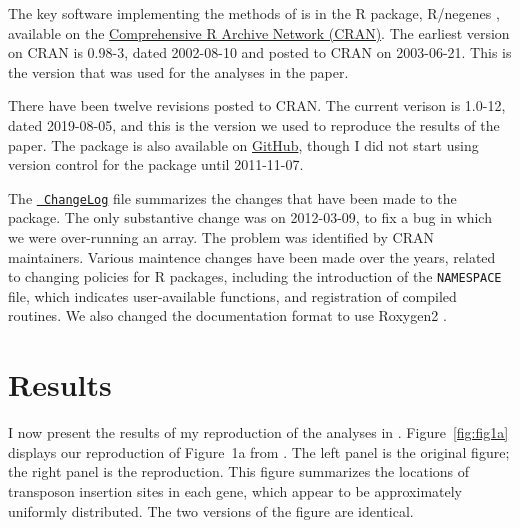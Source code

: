 The key software implementing the methods of \citet{lamichhane2003}
is in the R package, R/negenes \citep{negenes}, available on the
\href{https://cran.r-project.org/package=negenes}{Comprehensive R
Archive Network (CRAN)}. The earliest version on CRAN is 0.98-3, dated
2002-08-10 and posted to CRAN on 2003-06-21. This is the version that
was used for the analyses in the paper.

There have been twelve revisions posted to CRAN. The current verison
is 1.0-12, dated 2019-08-05, and this is the version we used to
reproduce the results of the paper. The package is also available on
\href{https://github.com/kbroman/negenes}{GitHub}, though I did not
start using version control for the package until 2011-11-07.

The \href{https://github.com/kbroman/negenes/blob/master/ChangeLog}{\tt
ChangeLog} file summarizes the changes that have been made to the
package. The only substantive change was on 2012-03-09, to fix a bug
in which we were over-running an array. The problem was identified by
CRAN maintainers. Various maintence changes have been made over the
years, related to changing policies for R packages, including the
introduction of the {\tt NAMESPACE} file, which indicates
user-available functions, and registration of compiled routines. We
also changed the documentation format to use
Roxygen2 \citep{roxygen2}.


\section{Results}

I now present the results of my reproduction of the analyses
in \citet{lamichhane2003}. Figure~\ref{fig:fig1a} displays our
reproduction of Figure~1a from \citet{lamichhane2003}. The left panel
is the original figure; the right panel is the reproduction. This
figure summarizes the locations of transposon insertion sites in each
gene, which appear to be approximately uniformly distributed. The two
versions of the figure are identical.

